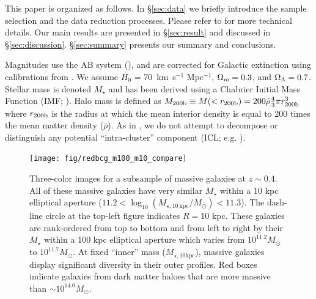 \documentclass[a4paper,fleqn,usenatbib]{mnras}
\def\mstar{{$M_{\star}$}}
\def\minn{{$M_{\star,10\mathrm{kpc}}$}}
\begin{document}
    This paper is organized as follows. 
    In \S \ref{sec:data} we briefly introduce the sample selection and the data 
    reduction processes.  
    Please refer to \citet{hscMassiveI} for more technical details.
    Our main results are presented in \S \ref{sec:result} and discussed in 
    \S \ref{sec:discussion}. 
    \S \ref{sec:summary} presents our summary and conclusions.

    Magnitudes use the AB system (\citealt{Oke1983}), and are corrected for Galactic 
    extinction using calibrations from \citet{Schlafly11}. 
    We assume $H_0$ = 70~km~s$^{-1}$ Mpc$^{-1}$, ${\Omega}_{\rm m}=0.3$, 
    and ${\Omega}_{\rm \Lambda}=0.7$.
    Stellar mass is denoted \mstar{} and has been derived using a Chabrier Initial Mass 
    Function (IMF; \citealt{Chabrier2003}). Halo mass is defined as 
    $M_{\rm 200b}\equiv M(<r_{\rm 200b})=200\bar{\rho} 
    \frac{4}{3}\pi r_{\rm 200b}^3$ where $r_{\rm 200b}$
    is the radius at which the mean interior density is equal to 200 times
    the mean matter density ($\bar{\rho}$). 
    As in \citet{hscMassiveI}, we do not attempt to decompose or distinguish any  
    potential ``intra-cluster'' 
    component (ICL; e.g. \citealt{Carlberg1997, Lin2004, Gonzalez2005, Mihos2005}). 
    

  \begin{figure}
      \centering 
      \texttt{[image: fig/redbcg\_m100\_m10\_compare]}
      \caption{
          Three-color images for a subsample of massive galaxies at $z{\sim}0.4$. 
          All of these massive galaxies have very similar \mstar{} within a 10 kpc 
          elliptical aperture 
          ($11.2<\log_{10} (M_{\star,10\ \mathrm{kpc}}/M_{\odot})<11.3$). 
          The dash-line circle at the top-left figure indicates $R=$10 kpc.
          These galaxies are rank-ordered from top to bottom and from left to right 
          by their \mstar{} within a 100 kpc elliptical aperture which varies 
          from $10^{11.2} M_{\odot}$ to $10^{11.7} M_{\odot}$. 
          At fixed ``inner'' mass (\minn{}), massive galaxies display significant
          diversity in their outer profiles. 
          Red boxes indicate galaxies from dark matter haloes that are more massive 
          than ${\sim} 10^{14.0} M_{\odot}$. 
          }
      \label{fig:m100_m10_color}
  \end{figure}
\end{document}
